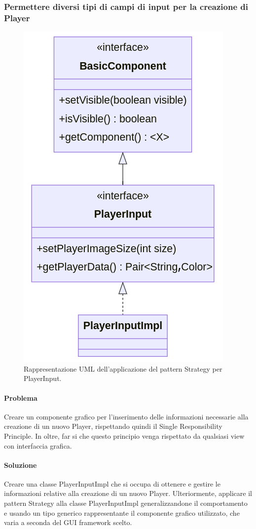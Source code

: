 \subsubsection*{Permettere diversi tipi di campi di input per la creazione di Player}
\begin{figure}[ht]
    \centering\includegraphics[scale=.35]{images/playerinput.png}
    \caption{Rappresentazione UML dell'applicazione del pattern Strategy per PlayerInput.}
\end{figure}
\paragraph{Problema}
Creare un componente grafico per l'inserimento delle informazioni necessarie alla creazione di un nuovo Player, rispettando quindi il Single Responsibility Principle. In oltre, far si che questo principio venga rispettato da qualsiasi view con interfaccia grafica.
\paragraph{Soluzione}
Creare una classe PlayerInputImpl che si occupa di ottenere e gestire le informazioni relative alla creazione di un nuovo Player. Ulteriormente, applicare il pattern Strategy alla classe PlayerInputImpl generalizzandone il comportamento e usando un tipo generico rappresentante il componente grafico utilizzato, che varia a seconda del GUI framework scelto.
\clearpage

